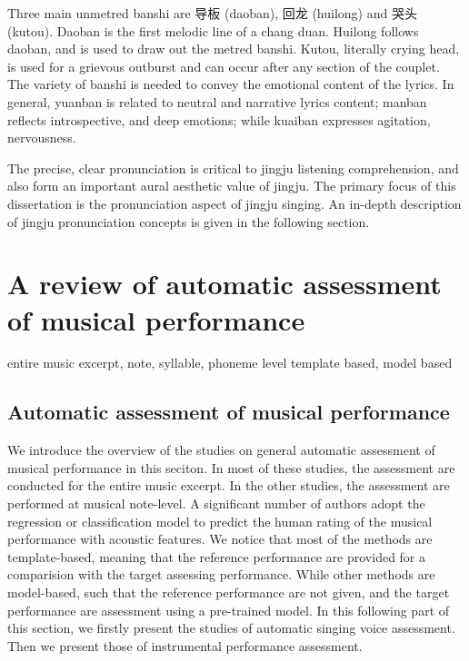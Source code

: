 Three main unmetred banshi are 导板 (daoban), 回龙 (huilong) and 哭头 (kutou). Daoban is the first melodic line of a chang duan. Huilong follows daoban, and is used to draw out the metred banshi. Kutou, literally crying head, is used for a grievous outburst and can occur after any section of the couplet. The variety of banshi is needed to convey the emotional content of the lyrics. In general, yuanban is related to neutral and narrative lyrics content; manban reflects introspective, and deep emotions; while kuaiban expresses agitation, nervousness.

The precise, clear pronunciation is critical to jingju listening comprehension, and also form an important aural aesthetic value of jingju. The primary focus of this dissertation is the pronunciation aspect of jingju singing. An in-depth description of jingju pronunciation concepts is given in the following section.

\section{A review of automatic assessment of musical performance}
entire music excerpt, note, syllable, phoneme level
template based, model based

\subsection{Automatic assessment of musical performance}

We introduce the overview of the studies on general automatic assessment of musical performance in this seciton. In most of these studies, the assessment are conducted for the entire music excerpt. In the other studies, the assessment are performed at musical note-level. A significant number of authors adopt the regression or classification model to predict the human rating of the musical performance with acoustic features. We notice that most of the methods are template-based, meaning that the reference performance are provided for a comparision with the target assessing performance. While other methods are model-based, such that the reference performance are not given, and the target performance are assessment using a pre-trained model. In this following part of this section, we firstly present the studies of automatic singing voice assessment. Then we present those of instrumental performance assessment.


